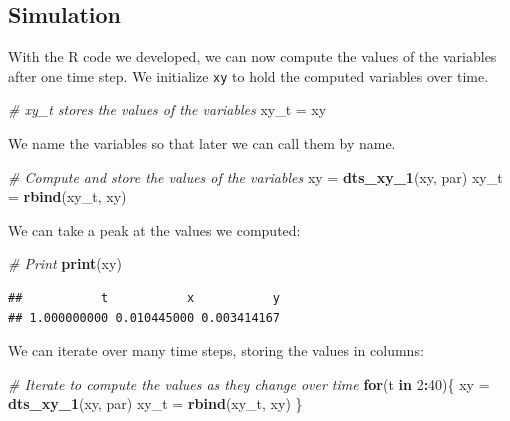 \documentclass[
]{book}
\newenvironment{Shaded}{\begin{snugshade}}{\end{snugshade}}
\newcommand{\CommentTok}[1]{\textcolor[rgb]{0.56,0.35,0.01}{\textit{#1}}}
\newcommand{\ControlFlowTok}[1]{\textcolor[rgb]{0.13,0.29,0.53}{\textbf{#1}}}
\newcommand{\DecValTok}[1]{\textcolor[rgb]{0.00,0.00,0.81}{#1}}
\newcommand{\FunctionTok}[1]{\textcolor[rgb]{0.13,0.29,0.53}{\textbf{#1}}}
\newcommand{\NormalTok}[1]{#1}
\newcommand{\OtherTok}[1]{\textcolor[rgb]{0.56,0.35,0.01}{#1}}
\newcommand{\SpecialCharTok}[1]{\textcolor[rgb]{0.81,0.36,0.00}{\textbf{#1}}}
\begin{document}
\subsection{Simulation}\label{simulation}

With the R code we developed, we can now compute the values of the variables after one time step. We initialize \texttt{xy} to hold the computed variables over time.

\begin{Shaded}
\begin{Highlighting}[]
\CommentTok{\# xy\_t stores the values of the variables}
\NormalTok{xy\_t }\OtherTok{=}\NormalTok{ xy }
\end{Highlighting}
\end{Shaded}

We name the variables so that later we can call them by name.

\begin{Shaded}
\begin{Highlighting}[]
\CommentTok{\# Compute and store the values of the variables  }
\NormalTok{xy }\OtherTok{=} \FunctionTok{dts\_xy\_1}\NormalTok{(xy, par)}
\NormalTok{xy\_t }\OtherTok{=} \FunctionTok{rbind}\NormalTok{(xy\_t, xy)}
\end{Highlighting}
\end{Shaded}

We can take a peak at the values we computed:

\begin{Shaded}
\begin{Highlighting}[]
\CommentTok{\# Print }
\FunctionTok{print}\NormalTok{(xy) }
\end{Highlighting}
\end{Shaded}

\begin{verbatim}
##           t           x           y 
## 1.000000000 0.010445000 0.003414167
\end{verbatim}

We can iterate over many time steps, storing the values in columns:

\begin{Shaded}
\begin{Highlighting}[]
\CommentTok{\# Iterate to compute the values as they change over time }
\ControlFlowTok{for}\NormalTok{(t }\ControlFlowTok{in} \DecValTok{2}\SpecialCharTok{:}\DecValTok{40}\NormalTok{)\{}
\NormalTok{  xy }\OtherTok{=} \FunctionTok{dts\_xy\_1}\NormalTok{(xy, par) }
\NormalTok{  xy\_t }\OtherTok{=} \FunctionTok{rbind}\NormalTok{(xy\_t, xy) }
\NormalTok{\} }
\end{Highlighting}
\end{Shaded}
\end{document}
